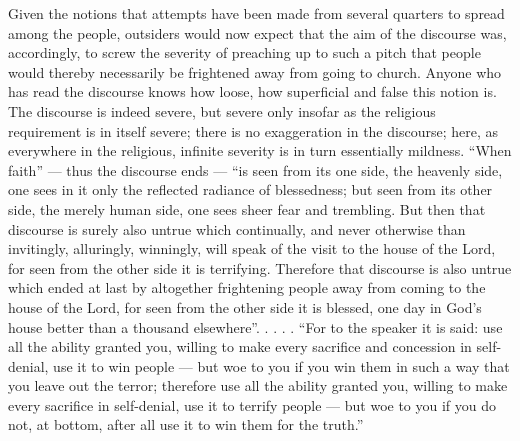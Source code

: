 \documentclass[12pt,a4paper]{article}
\newcommand{\opage}[1]{\marginnote{\footnotesize\textit{[#1]}}}
\begin{document}
Given the notions that attempts have been made from several quarters
to spread among the people, outsiders would now expect that the aim of
the discourse was, accordingly, to screw the severity of preaching up to
such a pitch that people would thereby necessarily be frightened away
from going to church. Anyone who has read the discourse knows how
loose, how superficial and false this notion is. The discourse is
indeed severe, but severe only insofar as the religious requirement is
in itself severe; there is no exaggeration in the discourse; here, as
everywhere in the religious, infinite severity is in turn essentially
mildness.
\opage{14}``When faith'' --- thus the discourse ends --- ``is seen from its one
side, the heavenly side, one sees in it only the reflected radiance of
blessedness; but seen from its other side, the merely human side, one
sees sheer fear and trembling. But then that discourse is surely also
untrue which continually, and never otherwise than invitingly,
alluringly, winningly, will speak of the visit to the house of the
Lord, for seen from the other side it is terrifying. Therefore that
discourse is also untrue which ended at last by altogether frightening
people away from coming to the house of the Lord, for seen from the
other side it is blessed, one day in God's house better than a
thousand elsewhere''. . . . . ``For to the speaker it is said: use all
the ability granted you, willing to make every sacrifice and concession
in self-denial, use it to win people --- but woe to you if you win them
in such a way that you leave out the terror; therefore use all the
ability granted you, willing to make every sacrifice in self-denial, use
it to terrify people --- but woe to you if you do not, at bottom, after
all use it to win them for the truth.''
\end{document}
